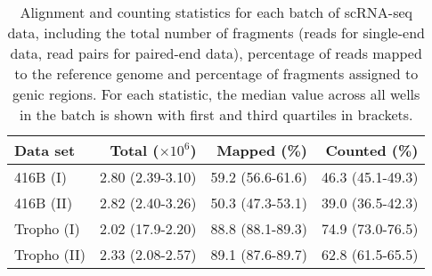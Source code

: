 \documentclass{article}
\begin{document}
\begin{table}[btp]
    \caption{Alignment and counting statistics for each batch of scRNA-seq data, including the total number of fragments (reads for single-end data, read pairs for paired-end data), percentage of reads mapped to the reference genome and percentage of fragments assigned to genic regions.
    For each statistic, the median value across all wells in the batch is shown with first and third quartiles in brackets.}
    \begin{center}
        \begin{tabular}{l r r r}
            \hline
            \textbf{Data set} & \textbf{Total ($\times 10^6$)} & \textbf{Mapped (\%)} & \textbf{Counted (\%)} \\
            \hline
            416B (I)  & 2.80 (2.39-3.10) & 59.2 (56.6-61.6) & 46.3 (45.1-49.3) \\
            416B (II) & 2.82 (2.40-3.26) & 50.3 (47.3-53.1) & 39.0 (36.5-42.3) \\
            Tropho (I) & 2.02 (17.9-2.20) & 88.8 (88.1-89.3) & 74.9 (73.0-76.5) \\
            Tropho (II) & 2.33 (2.08-2.57) & 89.1 (87.6-89.7) & 62.8 (61.5-65.5) \\
            \hline
        \end{tabular}
    \end{center}
\end{table}

\end{document}
